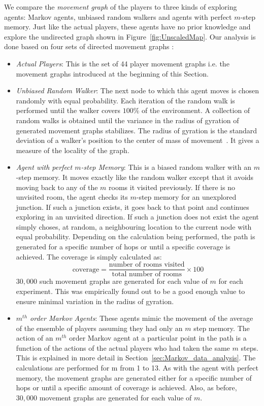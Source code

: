We compare the \emph{movement graph} of the players to three kinds of exploring agents: Markov agents, unbiased random walkers and agents with perfect $m$-step memory. Just like the actual players, these agents have no prior knowledge and explore the undirected graph shown in Figure~\ref{fig:UnscaledMap}. Our analysis is done based on four sets of directed movement graphs :
\begin{itemize}
    \item \emph{Actual Players}: This is the set of 44 player movement graphs i.e. the movement graphs introduced at the beginning of this Section.

    \item \emph{Unbiased Random Walker}:  The next node to which this agent moves is chosen randomly with equal probability. Each iteration of the random walk is performed until the walker covers $100\%$ of the environment. A collection of random walks is obtained until the variance in the radius of gyration of generated movement graphs stabilizes. The radius of gyration is the standard deviation of a walker's position to the center of mass of movement~\cite{cheng:footprints}. It gives a measure of the locality of the graph.

    \item \emph{Agent with perfect $m$-step Memory}: This is a biased random walker with an $m$-step memory. It moves exactly like the random walker except that it avoids moving back to any of the $m$ rooms it visited previously. If there is no unvisited room, the agent checks its $m$-step memory for an unexplored junction. If such a junction exists, it goes back to that point and continues exploring in an unvisited direction. If such a junction does not exist the agent simply choses,  at random,  a neighbouring location to the current node with equal probability. Depending on the calculation being performed, the path is generated for a specific number of hops or until a specific coverage is achieved. The coverage is simply calculated as:
    \begin{equation}
        \mbox{coverage} = \frac{\mbox{number of rooms visited}}{\mbox{total number of rooms}} \times 100
        \label{eq:CoverageEquation}
    \end{equation}
     $30,000$ such movement graphs are generated for each value of $m$ for each experiment. This was empirically found out to be a good enough value to ensure minimal variation in the radius of gyration.

    \item \emph{$m^{th}$ order Markov Agents}: These agents mimic the movement of the average of the ensemble of players assuming they had only an $m$ step memory. The action of an $m^{th}$ order Markov agent at a particular point in the path is a function of the actions of the actual players who had taken the same $m$ steps. This is explained in more detail in Section~\ref{sec:Markov_data_analysis}. The calculations are performed for m from 1 to 13. As with the agent with perfect memory, the movement graphs are generated either for a specific number of hops or until a specific amount of coverage is achieved. Also, as before, $30,000$ movement graphs are generated for each value of $m$.
\end{itemize}

